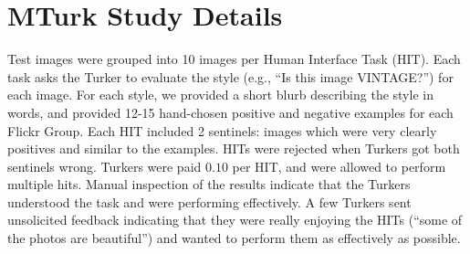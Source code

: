 \section{MTurk Study Details}\label{sec:mech_turk_details}

Test images were grouped into 10 images per Human Interface Task (HIT). Each task asks the Turker to evaluate the style (e.g., ``Is this image VINTAGE?'') for each image.  For each style, we provided a short blurb describing the style in words, and provided 12-15 hand-chosen positive and negative examples for each Flickr Group.
Each HIT included 2 sentinels: images which were very clearly positives and similar to the examples.  HITs were rejected when Turkers got both sentinels wrong.
Turkers were paid $0.10$ per HIT, and were allowed to perform multiple hits.  Manual inspection of the results indicate that the Turkers understood the task and were performing effectively.  A few Turkers sent unsolicited feedback indicating that they were really enjoying the HITs (``some of the photos are beautiful'') and wanted to perform them as effectively as possible.
